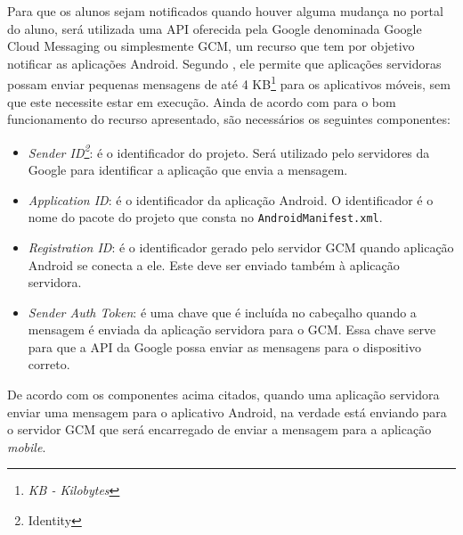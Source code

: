 
	\par Para que os alunos sejam notificados quando houver alguma mudança no
portal do aluno, será utilizada uma API oferecida pela Google denominada
Google Cloud Messaging ou simplesmente GCM, um recurso que tem por
objetivo notificar as aplicações Android. Segundo , ele
permite que aplicações servidoras possam enviar pequenas mensagens de até 4
KB\footnote{\textit{KB - Kilobytes}} para os aplicativos móveis, sem que este
necessite estar em execução. Ainda de acordo com  para o
bom funcionamento do recurso apresentado, são necessários os seguintes
componentes:

\begin{itemize}
	
	\item \textit{Sender ID\footnote{Identity}}: é o identificador do projeto.
	Será utilizado pelo servidores da Google para identificar a aplicação
	que envia a mensagem.
	
	\item \textit{Application ID}: é o identificador da aplicação Android. O
	identificador é o nome do pacote do projeto que consta no
	\texttt{AndroidManifest.xml}.
	
	\item \textit{Registration ID}: é o identificador gerado pelo servidor GCM
	quando aplicação Android se conecta a ele. Este deve ser enviado
	também à aplicação servidora.
	
	\item \textit{Sender Auth Token}: é uma chave que é incluída no cabeçalho
	quando a mensagem é enviada da aplicação servidora para o GCM. Essa chave serve
	para que a API da Google possa enviar as mensagens para o dispositivo
	correto.

\end{itemize}

	\par De acordo com os componentes acima citados, quando uma aplicação servidora
enviar uma mensagem para o aplicativo Android, na verdade está
enviando para o servidor GCM que será encarregado de enviar a mensagem para a aplicação
\textit{mobile}.
